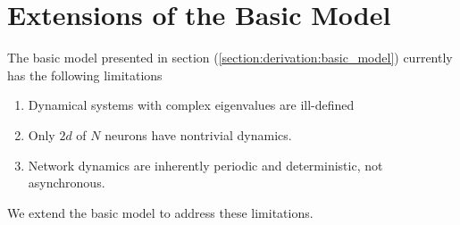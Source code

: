 \section{Extensions of the Basic Model}
The basic model presented in section (\ref{section:derivation:basic_model}) currently has the following limitations
\begin{enumerate}
\item Dynamical systems with complex eigenvalues are ill-defined
\item Only $2d$ of $N$ neurons have nontrivial dynamics. 
\item Network dynamics are inherently periodic and deterministic, not asynchronous. 
\end{enumerate}

We extend the basic model to address these limitations. 


